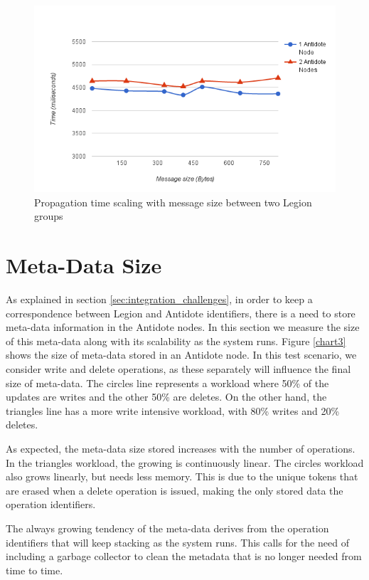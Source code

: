 \begin{figure}[H]
\centering
\includegraphics[scale=0.7]{files/chart5.png}
\caption{Propagation time scaling with message size between two Legion groups}
\label{chart5}
\end{figure}

\section{Meta-Data Size}
\label{sec:meta-data_size}
As explained in section \ref{sec:integration_challenges}, in order to keep a correspondence between Legion and Antidote identifiers, there is a need to store meta-data information in the Antidote nodes. In this section we measure the size of this meta-data along with its scalability as the system runs. Figure \ref{chart3} shows the size of meta-data stored in an Antidote node. In this test scenario, we consider write and delete operations, as these separately will influence the final size of meta-data. The circles line represents a workload where 50\% of the updates are writes and the other 50\% are deletes. On the other hand, the triangles line has a more write intensive workload, with 80\% writes and 20\% deletes.\par
	As expected, the meta-data size stored increases with the number of operations. In the triangles workload, the growing is continuously linear. The circles workload also grows linearly, but needs less memory. This is due to the unique tokens that are erased when a delete operation is issued, making the only stored data the operation identifiers.\par
	The always growing tendency of the meta-data derives from the operation identifiers that will keep stacking as the system runs. This calls for the need of including a garbage collector to clean the metadata that is no longer needed from time to time.

